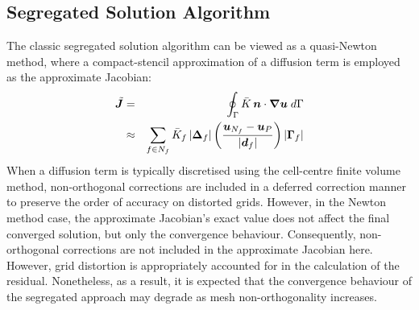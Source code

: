 \documentclass[sn-mathphys,Numbered]{sn-jnl}%
\newcommand{\bb}{\boldsymbol}
\begin{document}
\subsection{Segregated Solution Algorithm} 
\label{sec:seg_alg}
The classic segregated solution algorithm can be viewed as a quasi-Newton method, where a compact-stencil approximation of a diffusion term is employed as the approximate Jacobian:
\begin{eqnarray} \label{eq:diffusion}
	\tilde{\bb{J}} &=& \oint_{\Gamma} \bar{K} \, \bb{n} \cdot \bb{\nabla} \bb{u} \; d\Gamma \notag \\
	&\approx&
	\sum_{f \in N_f} \bar{K}_f \left|\bb{\Delta}_f\right| \left(\frac{\bb{u}_{N_f} - \bb{u}_P}{\left|\bb{d}_f\right|}\right)\left|\bb{\Gamma}_f\right|
\end{eqnarray}
When a diffusion term is typically discretised using the cell-centre finite volume method, non-orthogonal corrections are included in a deferred correction manner to preserve the order of accuracy on distorted grids.
However, in the Newton method case, the approximate Jacobian's exact value does not affect the final converged solution, but only the convergence behaviour.
Consequently, non-orthogonal corrections are not included in the approximate Jacobian here. However, grid distortion is appropriately accounted for in the calculation of the residual.
Nonetheless, as a result, it is expected that the convergence behaviour of the segregated approach may degrade as mesh non-orthogonality increases.
\end{document}
